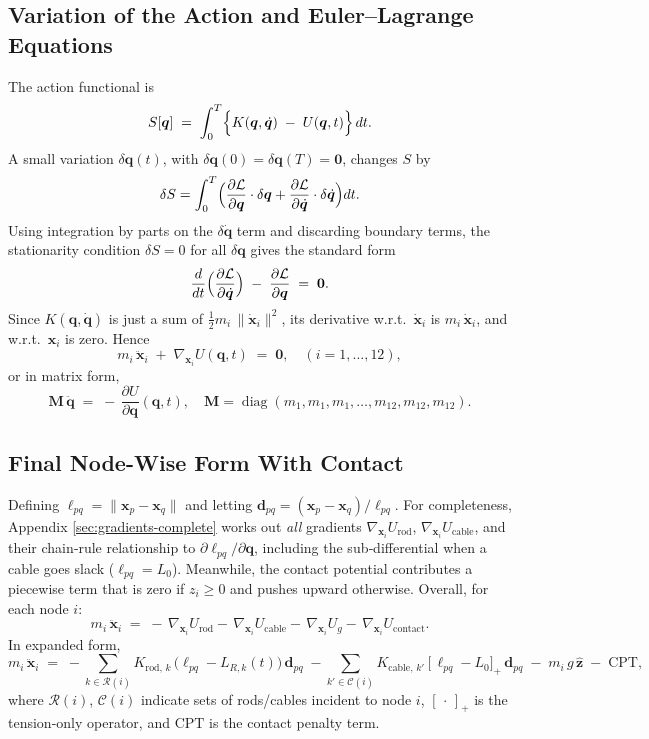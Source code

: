 \documentclass[12pt,letterpaper]{article}
\newcommand{\q}{\bm{q}}
\newcommand{\qd}{\dot{\bm{q}}}
\newcommand{\qdd}{\ddot{\bm{q}}}
\newcommand{\x}{\bm{x}}
\newcommand{\Lag}{\mathcal{L}}
\newcommand{\Mass}{\mathbf{M}}
\DeclareMathOperator{\diag}{diag}
\begin{document}
\subsection{Variation of the Action and Euler--Lagrange Equations}
The action functional is
\[
  S[\q]
   \;=\;\int_0^T \Bigl\{K(\q,\qd)\;-\;U(\q,t)\Bigr\}\,dt.
\]
A small variation $\delta \q(t)$, with $\delta\q(0)=\delta\q(T)=\bm{0}$, changes $S$ by
\[
  \delta S
    = \int_0^T\Bigl(
       \frac{\partial \Lag}{\partial \q}\cdot\delta \q
       + \frac{\partial \Lag}{\partial \qd}\cdot\delta \qd
      \Bigr)dt.
\]
Using integration by parts on the $\delta\qd$ term and discarding boundary terms, the stationarity condition $\delta S=0$ for all $\delta\q$ gives the standard form
\[
  \frac{d}{dt}\Bigl(\frac{\partial \Lag}{\partial \qd}\Bigr)
    \;-\;\frac{\partial \Lag}{\partial \q}
   \;=\;\bm{0}.
\]
Since $K(\q,\qd)$ is just a sum of $\tfrac12 m_i\,\|\dot{\x}_i\|^2$, its derivative w.r.t.\ $\dot{\x}_i$ is $m_i\,\dot{\x}_i$, and w.r.t.\ $\x_i$ is zero.  Hence
\[
  m_i\,\ddot{\x}_i \;+\;\nabla_{\!\x_i} U(\q,t) \;=\;\bm{0},
  \quad (i=1,\dots,12),
\]
or in matrix form,
\[
  \Mass\,\qdd
   \;=\;-\,\frac{\partial U}{\partial \q}(\q,t),
   \quad
   \Mass=\diag(m_1,m_1,m_1,\dots,m_{12},m_{12},m_{12}).
\]

\subsection{Final Node-Wise Form With Contact}
Defining $\ell_{pq}=\|\x_p-\x_q\|$ and letting $\bm{d}_{pq}=(\x_p-\x_q)/\ell_{pq}$. For completeness, Appendix \ref{sec:gradients-complete}
works out \emph{all} gradients
$\nabla_{\!\x_i}U_{\mathrm{rod}}$,
$\nabla_{\!\x_i}U_{\mathrm{cable}}$,
and their chain‑rule relationship to
$\partial\ell_{pq}/\partial\q$,
including the sub‑differential when a cable goes slack
($\ell_{pq}=L_0$). Meanwhile, the contact potential contributes a piecewise term that is zero if $z_i\ge0$ and pushes upward otherwise.  Overall, for each node $i$:
\begin{equation}
  m_i\,\ddot{\x}_i 
   \;=\; -\,\nabla_{\!\x_i}U_{\mathrm{rod}} 
          -\,\nabla_{\!\x_i}U_{\mathrm{cable}}
          -\,\nabla_{\!\x_i}U_g
          -\,\nabla_{\!\x_i}U_{\mathrm{contact}}.
  \label{eq:nodewise-main}
\end{equation}
In expanded form,
\[
  m_i\,\ddot{\x}_i
    \;=\;
    -\sum_{k\in\mathcal{R}(i)} K_{\text{rod},\,k}\,\bigl(\ell_{pq}-L_{R,k}(t)\bigr)\,\bm{d}_{pq}
    \;-\sum_{k'\in\mathcal{C}(i)}
      K_{\text{cable},\,k'}\,[\,\ell_{pq}-L_{0}\bigr]_+\,\bm{d}_{pq}
    \;-\;m_i\,g\,\hat{\bm{z}}
    \;-\;\mathrm{CPT},
\]
where $\mathcal{R}(i)$, $\mathcal{C}(i)$ indicate sets of rods/cables incident to node $i$, $[\,\cdot\,]_+$ is the tension-only operator, and $\mathrm{CPT}$ is the contact penalty term.
\end{document}
